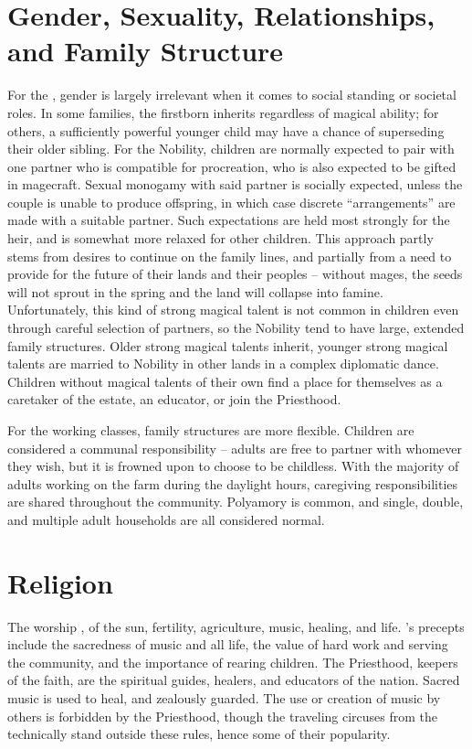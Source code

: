 \documentclass[blue]{GL2020}
\begin{document}
\section*{Gender, Sexuality, Relationships, and Family Structure}
For the \pFarm{}, gender is largely irrelevant when it comes to social standing or societal roles.  In some families, the firstborn inherits regardless of magical ability; for others, a sufficiently powerful younger child may have a chance of superseding their older sibling.  For the Nobility, children are normally expected to pair with one partner who is compatible for procreation, who is  also expected to be gifted in magecraft.  Sexual monogamy with said partner is socially expected, unless  the couple is unable to produce offspring, in which case discrete ``arrangements'' are made with a suitable partner. Such expectations are held most strongly for the heir, and is somewhat more relaxed for other children. This approach partly stems from desires to continue on the family lines, and partially from a need to provide for the future of their lands and their peoples -- without mages, the seeds will not sprout in the spring and the land will collapse into famine.  Unfortunately, this kind of strong magical talent is not common in children even through careful selection of partners, so the Nobility tend to have large, extended family structures.  Older strong magical talents inherit, younger strong magical talents are married to Nobility in other lands in a complex diplomatic dance.  Children without magical talents of their own find a place for themselves as a caretaker of the estate, an educator, or join the Priesthood.

For the working classes, family structures are more flexible.  Children are considered a communal responsibility – adults are free to partner with whomever they wish, but it is frowned upon to choose to be childless.  With the majority of adults working on the farm during the daylight hours, caregiving responsibilities are shared throughout the community.  Polyamory is common, and single, double, and multiple adult households are all considered normal.   

\section*{Religion}
The \pFarm{} worship \cFarmGod{}, \cFarmGod{\God} of the sun, fertility, agriculture, music, healing, and life.  \cFarmGod{}'s precepts include the sacredness of music and all life, the value of hard work and serving the community, and the importance of rearing children.  The Priesthood, keepers of the faith, are the spiritual guides, healers, and educators of the nation.  Sacred music is used to heal, and zealously guarded.  The use or creation of music by others is forbidden by the Priesthood, though the traveling circuses from the \pTech{} technically stand outside these rules, hence some of their popularity.
\end{document}

